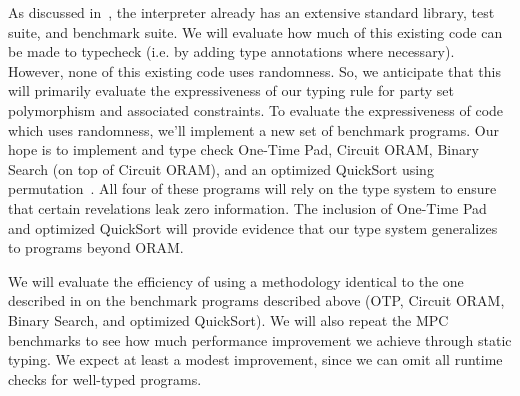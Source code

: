 As discussed in~, the \system interpreter already has an extensive standard library, test suite, and benchmark
suite. We will evaluate how much of this existing \system code can be made to typecheck (i.e. by adding type annotations where necessary).
However, none of this existing code uses randomness. So, we anticipate that this will primarily evaluate the expressiveness of our
typing rule for party set polymorphism and associated constraints. To evaluate the expressiveness of code which uses randomness,
we'll implement a new set of benchmark programs. Our hope is to implement and type check One-Time Pad, Circuit ORAM,
Binary Search (on top of Circuit ORAM), and an optimized QuickSort using permutation~\cite{hamada}. All four of these programs
will rely on the type system to ensure that certain revelations leak zero information. The inclusion of One-Time
Pad and optimized QuickSort will provide evidence that our type system generalizes to programs beyond ORAM.

We will evaluate the efficiency of \lang using a methodology identical to the one described in  on the
benchmark programs described above (OTP, Circuit ORAM, Binary Search, and optimized QuickSort). We will also repeat the MPC
benchmarks to see how much performance improvement we achieve through static typing. We expect at least a modest improvement,
since we can omit all runtime checks for well-typed programs.

